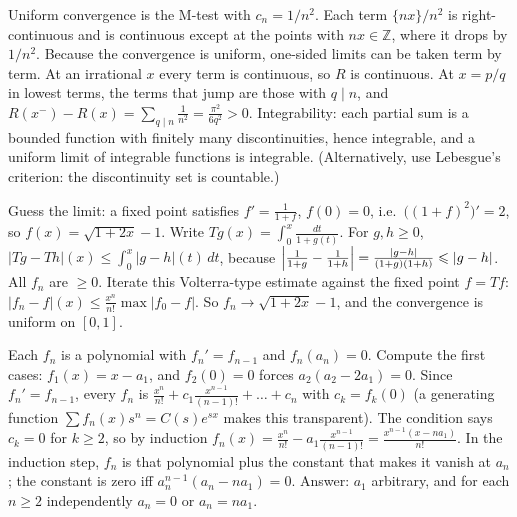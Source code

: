 \documentclass[11pt,a4paper]{article}
\begin{document}
Uniform convergence is the M-test with \(c_n=1/n^2\). Each term \(\{nx\}/n^2\) is right-continuous and is continuous except at the points with \(nx\in\mathbb Z\), where it drops by \(1/n^2\).
Because the convergence is uniform, one-sided limits can be taken term by term. At an irrational \(x\) every term is continuous, so \(R\) is continuous. At \(x=p/q\) in lowest terms, the terms that jump are those with \(q\mid n\), and \(R(x^-)-R(x)=\sum_{q\mid n}\frac1{n^2}=\frac{\pi^2}{6q^2}\gt0\).
Integrability: each partial sum is a bounded function with finitely many discontinuities, hence integrable, and a uniform limit of integrable functions is integrable. (Alternatively, use Lebesgue's criterion: the discontinuity set is countable.)

Guess the limit: a fixed point satisfies \(f'=\frac1{1+f}\), \(f(0)=0\), i.e.~\(\bigl((1+f)^2\bigr)'=2\), so \(f(x)=\sqrt{1+2x}-1\).
Write \(T g(x)=\int_0^x\frac{dt}{1+g(t)}\). For \(g,h\ge0\), \(\lvert Tg-Th\rvert(x)\le\int_0^x\lvert g-h\rvert(t)\,dt\), because \(\Bigl\lvert\frac1{1+g}-\frac1{1+h}\Bigr\rvert=\frac{\lvert g-h\rvert}{(1+g)(1+h)}\le\lvert g-h\rvert\). All \(f_n\) are \(\ge0\).
Iterate this Volterra-type estimate against the fixed point \(f=Tf\): \(\lvert f_n-f\rvert(x)\le\frac{x^n}{n!}\max\lvert f_0-f\rvert\). So \(f_n\to\sqrt{1+2x}-1\), and the convergence is uniform on \([0,1]\).

Each \(f_n\) is a polynomial with \(f_n'=f_{n-1}\) and \(f_n(a_n)=0\). Compute the first cases: \(f_1(x)=x-a_1\), and \(f_2(0)=0\) forces \(a_2(a_2-2a_1)=0\).
Since \(f_n'=f_{n-1}\), every \(f_n\) is \(\frac{x^n}{n!}+c_1\frac{x^{n-1}}{(n-1)!}+\dots+c_n\) with \(c_k=f_k(0)\) (a generating function \(\sum f_n(x)s^n=C(s)e^{sx}\) makes this transparent). The condition says \(c_k=0\) for \(k\ge2\), so by induction \(f_n(x)=\frac{x^n}{n!}-a_1\frac{x^{n-1}}{(n-1)!}=\frac{x^{n-1}(x-na_1)}{n!}\).
In the induction step, \(f_n\) is that polynomial plus the constant that makes it vanish at \(a_n\); the constant is zero iff \(a_n^{n-1}(a_n-na_1)=0\). Answer: \(a_1\) arbitrary, and for each \(n\ge2\) independently \(a_n=0\) or \(a_n=na_1\).
\end{document}
